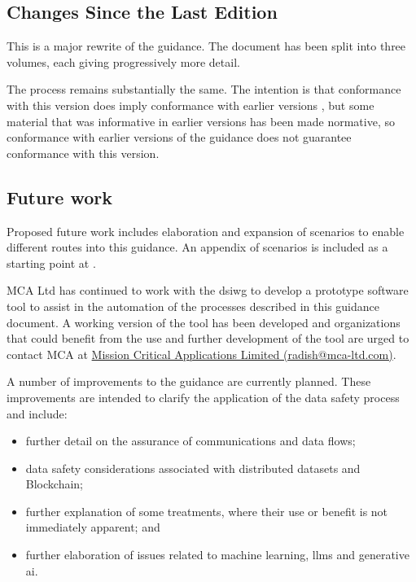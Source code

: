 \subsection*{Changes Since the Last Edition}
This is a major rewrite of the guidance. The document has been split into three volumes, each giving progressively more detail.

The process remains substantially the same. The intention is that conformance with this version does imply conformance with earlier versions , but some material that was informative in earlier versions has been made normative, so conformance with earlier versions of the guidance does not guarantee conformance with this version.
\subsection*{Future work}
Proposed future work includes elaboration and expansion of scenarios to enable different routes into this guidance. An appendix of scenarios is included as a starting point at .

MCA Ltd has continued to work with the \gls{dsiwg} to develop a prototype software tool to assist in the automation of the processes described in this guidance document.
A working version of the tool has been developed and organizations that could benefit from the use and further development of the tool are urged to contact MCA at \href{mailto:radish@mca-ltd.com}{Mission Critical Applications Limited (radish@mca-ltd.com)}.

A number of improvements to the guidance are currently planned.
These improvements are intended to clarify the application of the data safety process and include:
\begin{itemize}
	\item further detail on the assurance of communications and data flows;
	\item data safety considerations associated with distributed \glspl{dataset} and Blockchain;
	\item further explanation of some \glspl{treatment}, where their use or benefit is not immediately apparent; and 
	\item further elaboration of issues related to machine learning, \glspl{llm} and generative \gls{ai}.
	\end{itemize}

